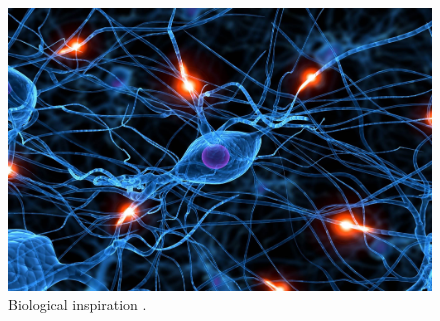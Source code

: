 \begin{figure}[!htb]
\centering
\includegraphics[width=.50\columnwidth]{images/048neuron0}
\caption[Biological inspiration]{Biological inspiration \cite{RefWorks:158}.}
\label{fig:048neuron0}
\end{figure}